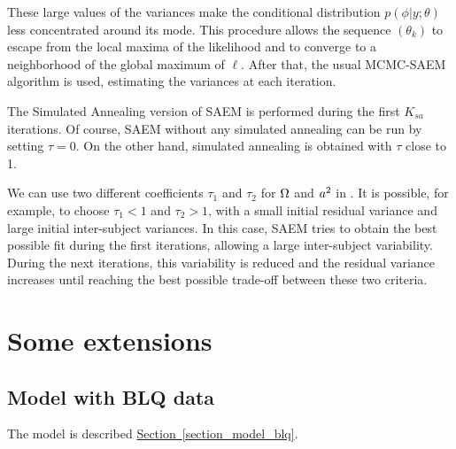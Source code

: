 These large values of the variances make the conditional distribution $p(\phi|y;\theta )$ less
concentrated around its mode. This procedure allows the sequence $(\theta_k)$ to escape from the
local maxima of the likelihood and to converge to a neighborhood of the global maximum of $\ell$.
After that, the usual MCMC-SAEM algorithm is used, estimating the variances at each iteration.


 The Simulated Annealing version of SAEM is performed during the first $K_{sa}$ iterations. Of course, SAEM without any
simulated annealing can be run by setting $\tau=0$. On the other hand, simulated annealing is obtained with $\tau$ close to 1.

 We can use two different coefficients
$\tau_1$ and $\tau_2$ for ${\Omega}$ and $a^2$ in \monolix. It is
possible, for example, to choose $\tau_1<1$ and $\tau_2>1$, with a
small initial residual variance and large initial inter-subject
variances. In this case, SAEM tries to obtain the best possible fit
during the first iterations, allowing a large inter-subject
variability. During the next iterations, this variability is reduced
and the residual variance increases until reaching the best possible
trade-off between these two criteria.

\section{Some extensions}
\subsection{Model with BLQ data} \label{section_methodo_blq}

The model is described \hyperref[section_model_blq]{Section~\ref*{section_model_blq}}.

